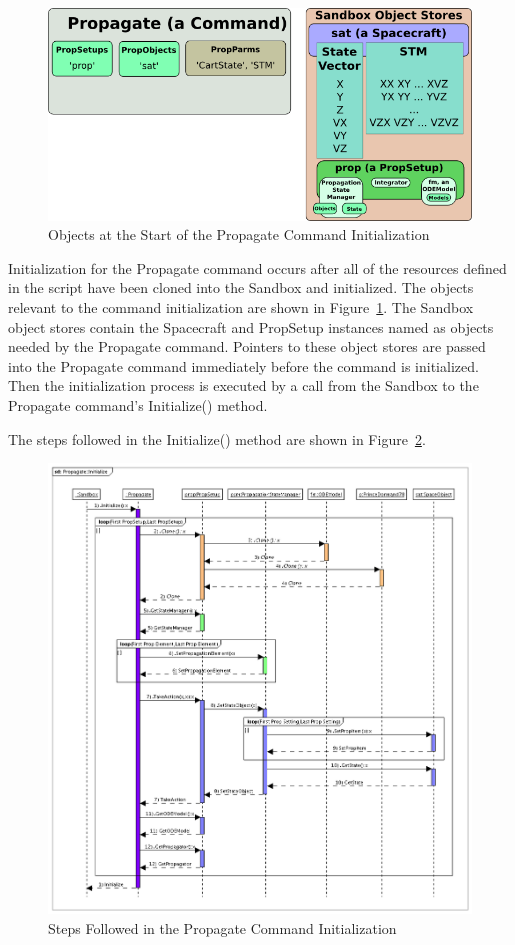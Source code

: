 \documentclass[10pt]{article}
\begin{document}
\begin{figure}[htb] 
   \centering
   \includegraphics[371,186]{Images/PersistenceStart.png} 
   \caption{Objects at the Start of the Propagate Command Initialization}
   \label{fig:PersistenceStart}
\end{figure}

Initialization for the Propagate command occurs after all of the resources defined in the script have been cloned into the Sandbox and initialized.  The objects relevant to the command initialization are shown in Figure~\ref{fig:PersistenceStart}.  The Sandbox object stores contain the Spacecraft and PropSetup instances named as objects needed by the Propagate command.  Pointers to these object stores are passed into the Propagate command immediately before the command is initialized.  Then the initialization process is executed by a call from the Sandbox to the Propagate command's Initialize() method.

The steps followed in the Initialize() method are shown in Figure~\ref{fig:PropagateInitialize}.

\begin{figure}[p] 
   \centering
   \includegraphics[495,526]{Images/PropagateInitialize.png} 
   \caption{Steps Followed in the Propagate Command Initialization}
   \label{fig:PropagateInitialize}
\end{figure}
\end{document}
